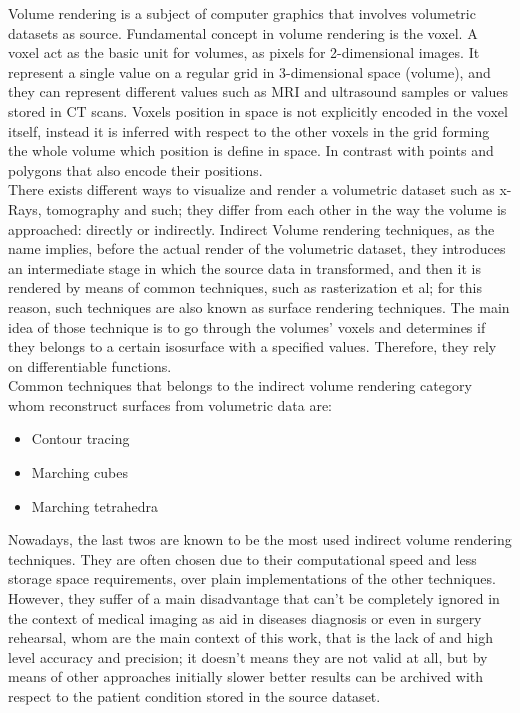 \documentclass[10pt,a4paper]{article}
\begin{document}
Volume rendering is a subject of computer graphics that involves volumetric datasets as source. Fundamental concept in volume rendering is the voxel. 
A voxel act as the basic unit for volumes, as pixels for 2-dimensional images.
It represent a single value on a regular grid in 3-dimensional space (volume), and they can represent different values such as MRI and ultrasound samples or values stored in CT scans. Voxels position in space is not explicitly encoded in the voxel itself, instead it is inferred with respect to the other voxels in the grid forming the whole volume which position is define in space. In contrast with points and polygons that also encode their positions.\\ %

There exists different ways to visualize and render a volumetric dataset such as x-Rays, tomography and such; they differ from each other in the way the volume is approached: directly or indirectly.
Indirect Volume rendering techniques, as the name implies, before the actual render of the volumetric dataset, they introduces an intermediate stage in which the source data in transformed, and then it is rendered by means of common techniques, such as rasterization et al; for this reason, such techniques are also known as surface rendering techniques.
The main idea of those technique is to go through the volumes' voxels and determines if they belongs to a certain isosurface with a specified values. Therefore, they rely on differentiable functions.\\
Common techniques that belongs to the indirect volume rendering category whom reconstruct surfaces from volumetric data are: \begin{itemize}
\item Contour tracing
\item Marching cubes
\item Marching tetrahedra
\end{itemize}

Nowadays, the last twos are known to be the most used indirect volume rendering techniques.
They are often chosen due to their computational speed %
and less storage space requirements, over plain implementations of the other techniques. However, they suffer of a main disadvantage that can't be completely ignored in the context of medical imaging as aid in diseases diagnosis or even in surgery rehearsal, whom are the main context of this work, that is the lack of and high level accuracy and precision; it doesn't means they are not valid at all, but by means of other approaches initially slower better results can be archived with respect to the patient condition stored in the source dataset.\\  
\end{document}
